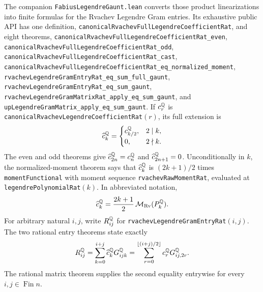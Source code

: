\documentclass[11pt,oneside]{article}
\theoremstyle{definition}
\theoremstyle{remark}
\newcommand{\FullRvachevLegendreCoefficientRat}[1]{\widehat c_{#1}^{\RationalNumbers}}
\begin{document}
The companion \nolinkurl{FabiusLegendreGaunt.lean} converts those product
linearizations into finite formulas for the Rvachev Legendre Gram entries.  Its
exhaustive public API has one definition,
\nolinkurl{canonicalRvachevFullLegendreCoefficientRat}, and eight theorems,
\nolinkurl{canonicalRvachevFullLegendreCoefficientRat_even},
\nolinkurl{canonicalRvachevFullLegendreCoefficientRat_odd},
\nolinkurl{canonicalRvachevFullLegendreCoefficientRat_cast},
\nolinkurl{canonicalRvachevFullLegendreCoefficientRat_eq_normalized_moment},
\nolinkurl{rvachevLegendreGramEntryRat_eq_sum_full_gaunt},
\nolinkurl{rvachevLegendreGramEntryRat_eq_sum_gaunt},
\nolinkurl{rvachevLegendreGramMatrixRat_apply_eq_sum_gaunt}, and
\nolinkurl{upLegendreGramMatrix_apply_eq_sum_gaunt}.
If \(c_r^{\mathbb{Q}}\) is
\nolinkurl{canonicalRvachevLegendreCoefficientRat}\((r)\), its full extension is
\[
 \FullRvachevLegendreCoefficientRat{k}=
 \begin{cases}
   c_{k/2}^{\RationalNumbers},&2\mid k,\\
   0,&2\nmid k.
 \end{cases}
\]
The even and odd theorems give
\(\FullRvachevLegendreCoefficientRat{2n}=c_n^{\RationalNumbers}\) and
\(\FullRvachevLegendreCoefficientRat{2n+1}=0\).  Unconditionally in \(k\), the
normalized-moment theorem says that \(\FullRvachevLegendreCoefficientRat{k}\) is
\((2k+1)/2\) times \nolinkurl{momentFunctional} with moment sequence
\nolinkurl{rvachevRawMomentRat}, evaluated at
\nolinkurl{legendrePolynomialRat}\((k)\).  In abbreviated notation,
\[
 \FullRvachevLegendreCoefficientRat{k}
 =\frac{2k+1}{2}\,\mathcal M_{\mathrm{Rv}}(P_k^{\RationalNumbers}).
\]
For arbitrary natural \(i,j\), write \(R_{ij}^{\mathbb{Q}}\) for
\nolinkurl{rvachevLegendreGramEntryRat}\((i,j)\).  The two rational entry
theorems state exactly
\[
 R_{ij}^{\RationalNumbers}
 =\sum_{k=0}^{i+j}\FullRvachevLegendreCoefficientRat{k}
    G^{\RationalNumbers}_{ijk}
 =\sum_{r=0}^{\Floor{(i+j)/2}}c_r^{\RationalNumbers}
    G^{\RationalNumbers}_{ij,2r}.
\]
The rational matrix theorem supplies the second equality entrywise for every
\(i,j\in\operatorname{Fin} n\).
\end{document}
